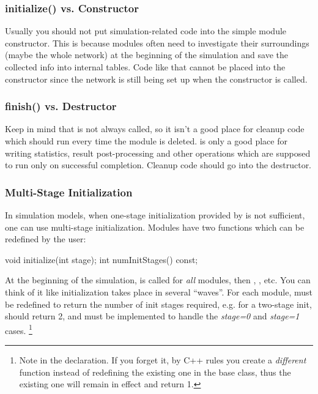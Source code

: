 \subsubsection{initialize() vs. Constructor}


Usually you should not put simulation-related code into the
simple module constructor. This is because
modules often need to investigate their surroundings (maybe
the whole network) at the beginning of the simulation and save the
collected info into internal tables.  Code like that cannot be placed
into the constructor since the network is still being set up when the
constructor is called.


\subsubsection{finish() vs. Destructor}


Keep in mind that  is not always called, so it isn't a
good place for cleanup code which should run every time the module is
deleted.  is only a good place for writing statistics,
result post-processing and other operations  which are supposed to run only on
successful completion. Cleanup code should go into the
destructor.


\subsubsection{Multi-Stage Initialization}
\label{sec:simple-modules:multi-stage-init}


In simulation models, when one-stage
initialization provided by 
is not sufficient, one can use multi-stage
initialization.  Modules have two
functions which can be redefined by the user:

\begin{cpp}
void initialize(int stage);
int numInitStages() const;
\end{cpp}

At the beginning of the simulation, 
is called for \textit{all} modules, then ,
, etc. You can think of it like
initialization takes place in several ``waves''. For each module,
 must be redefined to return the number of init
stages required, e.g. for a two-stage init, 
should return 2, and  must be implemented to
handle the \textit{stage=0} and \textit{stage=1} cases.
  \footnote{Note  in the  declaration.
  If you forget it, by C++ rules you create a \textit{different} function
  instead of redefining the existing one in the base class, thus the
  existing one will remain in effect and return 1.}

